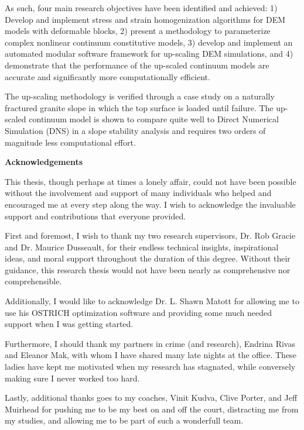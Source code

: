 As such, four main research objectives have been identified and achieved: 1) Develop and implement stress and strain homogenization algorithms for DEM models with deformable blocks, 2) present a methodology to parameterize complex nonlinear continuum constitutive models, 3) develop and implement an automated modular software framework for up-scaling DEM simulations, and 4) demonstrate that the performance of the up-scaled continuum models are accurate and significantly more computationally efficient.

The up-scaling methodology is verified through a case study on a naturally fractured granite slope in which the top surface is loaded until failure. The up-scaled continuum model is shown to compare quite well to Direct Numerical Simulation (DNS) in a slope stability analysis and requires two orders of magnitude less computational effort.

\cleardoublepage


\begin{center}\textbf{Acknowledgements}\end{center}

This thesis, though perhaps at times a lonely affair, could not have been possible without the involvement and support of many individuals who helped and encouraged me at every step along the way. I wish to acknowledge the invaluable support and contributions that everyone provided. 

First and foremost, I wish to thank my two research supervisors, Dr. Rob Gracie and Dr. Maurice Dusseault, for their endless technical insights, inspirational ideas, and moral support throughout the duration of this degree. Without their guidance, this research thesis would not have been nearly as comprehensive nor comprehensible.

Additionally, I would like to acknowledge Dr. L. Shawn Matott for allowing me to use his OSTRICH optimization software and providing some much needed support when I was getting started. 

Furthermore, I should thank my partners in crime (and research), Endrina Rivas and Eleanor Mak, with whom I have shared many late nights at the office. These ladies have kept me motivated when my research has stagnated, while conversely making sure I never worked too hard. 

Lastly, additional thanks goes to my coaches, Vinit Kudva, Clive Porter, and Jeff Muirhead for pushing me to be my best on and off the court, distracting me from my studies, and allowing me to be part of such a wonderfull team.

